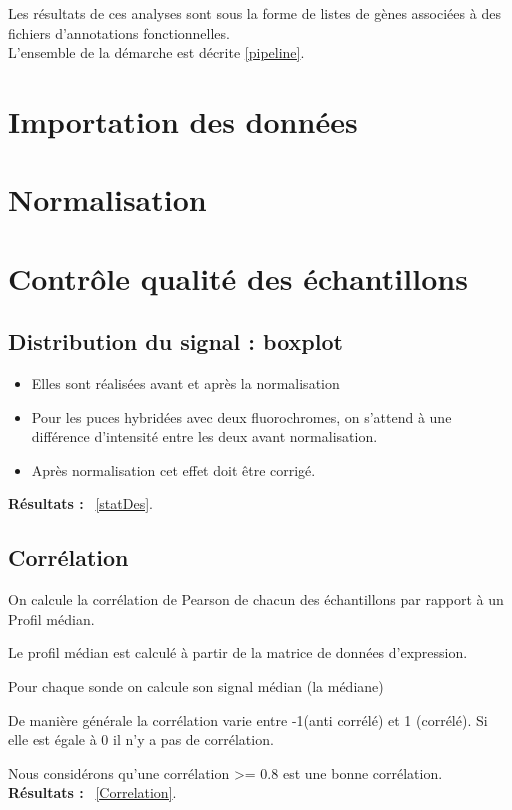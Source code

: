 \documentclass[a4paper]{article}
\begin{document}
 Les résultats de ces analyses sont sous la forme de listes de gènes associées à des fichiers d'annotations fonctionnelles. 
\\
L'ensemble de la démarche est décrite \ref{pipeline}.



\section{Importation des données}



%


\section{Normalisation}


\section{Contrôle qualité des échantillons}
\subsection{Distribution du signal : boxplot}
\begin{itemize}
\item Elles sont réalisées avant et après la normalisation
\item Pour les puces hybridées avec deux fluorochromes, on s'attend à une différence d'intensité entre les deux avant normalisation.
\item Après normalisation cet effet doit être corrigé.
\end{itemize}


\textbf{Résultats :} ~\ref{statDes}.

\subsection{Corrélation}
On calcule la corrélation de Pearson de chacun des échantillons par rapport à un Profil médian.
\par
Le profil médian est calculé à partir de la matrice de données d'expression. 
\par
Pour chaque sonde on calcule son signal médian (la médiane)
%
\par
De manière générale la corrélation varie entre -1(anti corrélé) et 1 (corrélé).
Si elle est égale à 0 il n'y a pas de corrélation.
\par
Nous considérons qu'une corrélation >= 0.8 est une bonne corrélation.
\\
\textbf{Résultats :} ~\ref{Correlation}.

\end{document}
